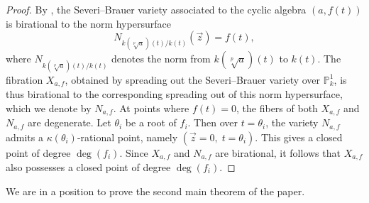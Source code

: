 \documentclass[11pt]{amsart}
\theoremstyle{plain}
\theoremstyle{definition}
\begin{document}
\begin{proof}
By \cite[Theorem 74]{kol}, the Severi--Brauer variety associated to the cyclic algebra $(a,f(t))$ is birational to the norm hypersurface
\[
N_{k(\sqrt[p]{a})(t)/k(t)}(\vec{z}) = f(t),
\]
where $N_{k(\sqrt[p]{a})(t)/k(t)}$ denotes the norm from $k(\sqrt[p]{a})(t)$ to $k(t)$. The fibration $X_{a,f}$, obtained by spreading out the Severi--Brauer variety over $\mathbb{P}^1_k$, is thus birational to the corresponding spreading out of this norm hypersurface, which we denote by $N_{a,f}$. At points where $f(t)=0$, the fibers of both $X_{a,f}$ and $N_{a,f}$ are degenerate. 
Let $\theta_i$ be a root of $f_i$. Then over $t=\theta_i$, the variety $N_{a,f}$ admits a $\kappa(\theta_i)$-rational point, namely $(\vec{z}=0,\; t=\theta_i).$
This gives a closed point of degree $\deg(f_i)$.  Since $X_{a,f}$ and $N_{a,f}$ are birational, it follows that $X_{a,f}$ also possesses a closed point of degree $\deg(f_i)$.
\end{proof}
We are in a position to prove the second main theorem of the paper.
\end{document}
